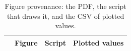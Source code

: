 \documentclass[11pt]{article}
\newcommand{\provrows}{}
\begin{document}
\begin{table}[t]
\centering
\footnotesize
\caption{Figure provenance: the PDF, the script that draws it, and the CSV of plotted values.}
\label{tab:provenance}
\begin{tabular}{@{}l>{\raggedright\arraybackslash}p{}>{\raggedright\arraybackslash}p{}>{\raggedright\arraybackslash}p{}@{}}
\toprule
& Figure & Script & Plotted values \\
\midrule
\provrows
\bottomrule
\end{tabular}
\end{table}
\end{document}
